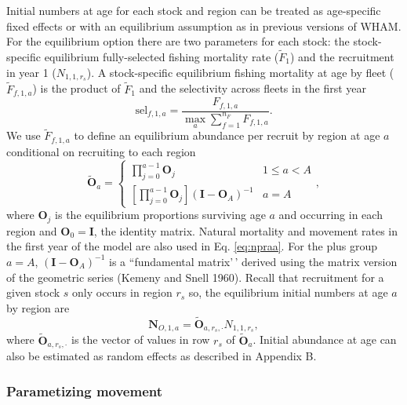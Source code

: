 \documentclass[
]{article}
\begin{document}
Initial numbers at age for each stock and region can be treated as age-specific fixed effects or with an equilibrium assumption as in previous versions of WHAM. For the equilibrium option there are two parameters for each stock: the stock-specific equilibrium fully-selected fishing mortality rate (\(\widetilde{F}_1\)) and the recruitment in year 1 (\(N_{1,1,r_s}\)). A stock-specific equilibrium fishing mortality at age by fleet (\(\widetilde{F}_{f,1,a}\)) is the product of \(\widetilde{F}_1\) and the selectivity across fleets in the first year
\begin{equation*}
  \text{sel}_{f,1,a} = \frac{F_{f,1,a}}{\max_a \sum_{f=1}^{n_F} F_{f,1,a}}.
\end{equation*}
We use \(\widetilde{F}_{f,1,a}\) to define an equilibrium abundance per recruit by region at age \(a\) conditional on recruiting to each region
\begin{equation}\label{eq:npraa}
 \widetilde{\mathbf{O}}_{a} = \left\{
 \begin{array}{ll}
\prod^{a-1}_{j=0}\mathbf{O}_{j}  & 1\leq a<A\\
\left[\prod^{a-1}_{j=0}\mathbf{O}_{j}\right] \left(\mathbf{I} - \mathbf{O}_{A}\right)^{-1} & a = A
 \end{array},
\right.
\end{equation}
where \(\mathbf{O}_{j}\) is the equilibrium proportions surviving age \(a\) and occurring in each region and \(\mathbf{O}_{0} = \mathbf{I}\), the identity matrix. Natural mortality and movement rates in the first year of the model are also used in Eq. \ref{eq:npraa}. For the plus group \(a=A\), \(\left(\mathbf{I} - \mathbf{O}_{A}\right)^{-1}\) is a ``fundamental matrix'\,' derived using the matrix version of the geometric series (Kemeny and Snell 1960). Recall that recruitment for a given stock \(s\) only occurs in region \(r_s\) so, the equilibrium initial numbers at age \(a\) by region are
\[\mathbf{N}_{O,1,a} = \widetilde{\mathbf{O}}_{a,r_s,\cdot} N_{1,1,r_s},\]
where \(\widetilde{\mathbf{O}}_{a,r_s,\cdot}\) is the vector of values in row \(r_s\) of \(\widetilde{\mathbf{O}}_{a}\). Initial abundance at age can also be estimated as random effects as described in Appendix B.

\hypertarget{parametizing-movement}{%
\subsubsection*{Parametizing movement}\label{parametizing-movement}}
\end{document}
